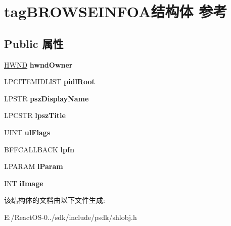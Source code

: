 \hypertarget{structtag_b_r_o_w_s_e_i_n_f_o_a}{}\section{tag\+B\+R\+O\+W\+S\+E\+I\+N\+F\+O\+A结构体 参考}
\label{structtag_b_r_o_w_s_e_i_n_f_o_a}
\subsection*{Public 属性}
\begin{DoxyCompactItemize}
\item 
\mbox{\label{structtag_b_r_o_w_s_e_i_n_f_o_a_a5aecf7fec5cd8080bc19c931255bf2d1}} 
\hyperlink{interfacevoid}{H\+W\+ND} {\bfseries hwnd\+Owner}
\item 
\mbox{\label{structtag_b_r_o_w_s_e_i_n_f_o_a_a6f18407e9b4093a2138e048a85219621}} 
L\+P\+C\+I\+T\+E\+M\+I\+D\+L\+I\+ST {\bfseries pidl\+Root}
\item 
\mbox{\label{structtag_b_r_o_w_s_e_i_n_f_o_a_a8430fbed6975face65f8b735b2c2d766}} 
L\+P\+S\+TR {\bfseries psz\+Display\+Name}
\item 
\mbox{\label{structtag_b_r_o_w_s_e_i_n_f_o_a_a012b4472c1b54d2e1156f3c0959651ef}} 
L\+P\+C\+S\+TR {\bfseries lpsz\+Title}
\item 
\mbox{\label{structtag_b_r_o_w_s_e_i_n_f_o_a_a864982cae74c0ad1a47996010ae7fe78}} 
U\+I\+NT {\bfseries ul\+Flags}
\item 
\mbox{\label{structtag_b_r_o_w_s_e_i_n_f_o_a_a4befbec7a106e4220bf449f65fbe546b}} 
B\+F\+F\+C\+A\+L\+L\+B\+A\+CK {\bfseries lpfn}
\item 
\mbox{\label{structtag_b_r_o_w_s_e_i_n_f_o_a_a865724826609e27a51997ebc848d8b32}} 
L\+P\+A\+R\+AM {\bfseries l\+Param}
\item 
\mbox{\label{structtag_b_r_o_w_s_e_i_n_f_o_a_a2805a3456ade514eae5840bd1f06f4f5}} 
I\+NT {\bfseries i\+Image}
\end{DoxyCompactItemize}


该结构体的文档由以下文件生成\+:\begin{DoxyCompactItemize}
\item 
E\+:/\+React\+O\+S-\/0../sdk/include/psdk/shlobj.\+h\end{DoxyCompactItemize}
